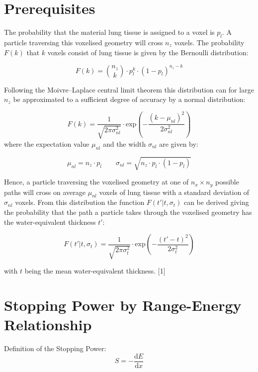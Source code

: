 \documentclass{article}
\begin{document}
\section{Prerequisites}
The probability that the material lung tissue is assigned to a voxel is $p_l$. A particle traversing
this voxelised geometry will cross $n_z$ voxels. The probability $F(k)$ that $k$ voxels consist of lung
tissue is given by the Bernoulli distribution:

\begin{equation}
    F(k) = \binom{n_z}{k} \cdot p_l^k \cdot (1-p_l)^{n_z-k}
\end{equation}

Following the Moivre–Laplace central limit theorem this distribution can for large $n_z$ be
approximated to a sufficient degree of accuracy by a normal distribution:

\begin{equation}
    F(k) = \frac{1}{\sqrt{2\pi \sigma_{nl}^2}} \cdot \text{exp}\left( -\frac{(k-\mu_{nl})^2}{2\sigma_{nl}^2} \right)
\end{equation}
where the expectation value $\mu_{nl}$ and the width $\sigma_{nl}$ are given by:

\begin{equation}
\label{bin}
    \mu_{nl} = n_z \cdot p_l \qquad  \sigma_{nl} = \sqrt{n_z\cdot p_l\cdot (1-p_l)}
\end{equation}

Hence, a particle traversing the voxelised geometry at one of $n_x \times n_y$ possible paths will cross
on average $\mu_{nl}$ voxels of lung tissue with a standard deviation of $\sigma_{nl}$ voxels.
From this distribution the function $F(t'|t, \sigma_{t})$ can be derived giving the probability that the path a particle takes through the voxelised geometry has the water-equivalent thickness $t'$:

\begin{equation}
    F(t'|t, \sigma_{t}) = \frac{1}{\sqrt{2\pi \sigma_{t}^2}} \cdot \text{exp}\left( -\frac{(t'-t)^2}{2\sigma_{t}^2} \right)
\end{equation}

with $t$ being the mean water-equivalent thickness. [1]


\section{Stopping Power by Range-Energy Relationship}
Definition of the Stopping Power:
\begin{equation}
    \label{S}
    S = -\frac{\text{d}E}{\text{d}x}
\end{equation}
\end{document}
